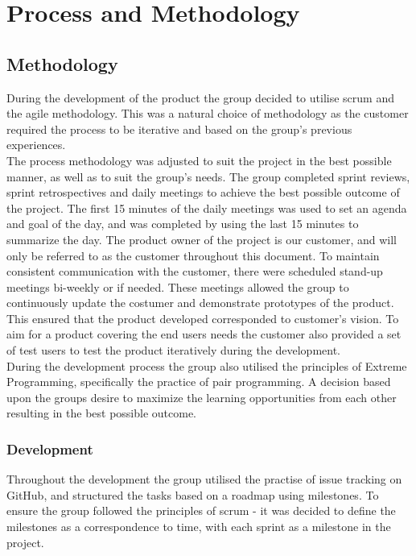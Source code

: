 
\chapter{Process and Methodology}

\section{Methodology}
\label{methodology}
During the development of the product the group decided to utilise scrum and the agile methodology. This was a natural choice of methodology as the customer required the process to be iterative and based on the group's previous experiences.\\ 

\noindent The process methodology was adjusted to suit the project in the best possible manner, as well as to suit the group's needs. The group completed sprint reviews, sprint retrospectives and daily meetings to achieve the best possible outcome of the project. The first 15 minutes of the daily meetings was used to set an agenda and goal of the day, and was completed by using the last 15 minutes to summarize the day. The product owner of the project is our customer, and will only be referred to as the customer throughout this document. To maintain consistent communication with the customer, there were scheduled stand-up meetings bi-weekly or if needed. These meetings allowed the group to continuously update the costumer and demonstrate prototypes of the product. This ensured that the product developed corresponded to customer's vision. To aim for a product covering the end users needs the customer also provided a set of test users to test the product iteratively during the development. \\

\noindent During the development process the group also utilised the principles of Extreme Programming, specifically the practice of pair programming. A decision based upon the groups desire to maximize the learning opportunities from each other resulting in the best possible outcome. 

\subsection{Development}
Throughout the development the group utilised the practise of issue tracking on GitHub, and structured the tasks based on a roadmap using milestones. To ensure the group followed the principles of scrum - it was decided to define the milestones as a correspondence to time, with each sprint as a milestone in the project. \\

